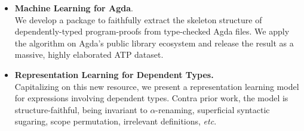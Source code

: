 \documentclass{article}
\begin{document}
\begin{minipage}[t]{0.29\textwidth}
	\begin{itemize}[topsep=-0.25\baselineskip]
		\item \textbf{Machine Learning for Agda}.\\
		We develop a package to faithfully extract the skeleton structure of dependently-typed program-proofs from type-checked Agda files. We apply the algorithm on Agda's public library ecosystem and release the result as a massive, highly elaborated ATP dataset.
		\item \textbf{Representation Learning for Dependent Types.}\\
		Capitalizing on this new resource, we present a representation learning model for expressions involving dependent types. Contra prior work, the model is structure-faithful, being invariant to $\alpha$-renaming, superficial syntactic sugaring, scope permutation, irrelevant definitions, \textit{etc}. 
	\end{itemize}
	
	\end{minipage}\hfill
\end{document}
